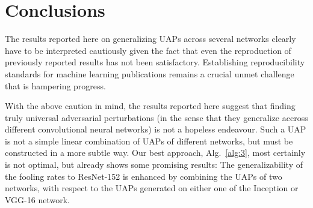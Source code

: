\documentclass[runningheads]{llncs}
\begin{document}
\section{Conclusions}
The results reported here on generalizing UAPs across several networks clearly have to be interpreted cautiously given the fact that even the reproduction of previously reported results has not been satisfactory. Establishing reproducibility standards for machine learning publications remains a crucial unmet challenge that is hampering progress.

With the above caution in mind, the results reported here suggest that finding truly universal adversarial perturbations (in the sense that they generalize accross different convolutional neural networks) is not a hopeless endeavour. Such a UAP is not a simple linear combination of UAPs of different networks, but must be constructed in a more subtle way. Our best approach, Alg.~\ref{alg:3}, most certainly is not optimal, but already shows some promising results: The generalizability of the fooling rates to ResNet-152 is enhanced by combining the UAPs of two networks, with respect to the UAPs generated on either one of the Inception or VGG-16 network.



\end{document}
